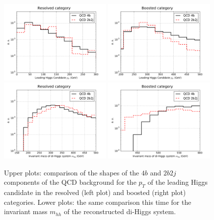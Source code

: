 \begin{figure}[t]
\begin{center}
 \includegraphics[width=0.49\textwidth]{plots/pt_h0_C2_res_back_noPU.pdf}
 \includegraphics[width=0.49\textwidth]{plots/pt_h0_C2_bst_back_noPU.pdf}
  \includegraphics[width=0.49\textwidth]{plots/m_hh_C2_res_back_noPU.pdf}
  \includegraphics[width=0.49\textwidth]{plots/m_hh_C2_bst_back_noPU.pdf}
  \caption{\small
    Upper plots: comparison
    of the shapes of the $4b$ and $2b2j$
components of the QCD background for the $p_T$ of the leading
Higgs candidate in the resolved
(left plot) and boosted (right plot) categories.
Lower plots: the same comparison this time for the invariant
mass $m_{hh}$ of the
    reconstructed di-Higgs system.
}
\label{fig:histoBack}
\end{center}
\end{figure}

